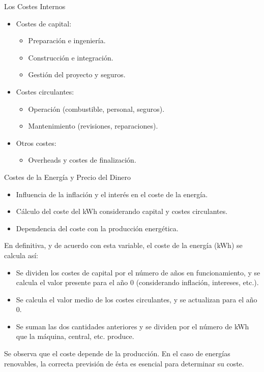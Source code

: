 \documentclass[main.tex]{subfiles}
\begin{document}
\begin{frame}{Los Costes Internos}
    \begin{itemize}
        \item Costes de capital:
        \begin{itemize}
            \item Preparación e ingeniería.
            \item Construcción e integración.
            \item Gestión del proyecto y seguros.
        \end{itemize}
        \item Costes circulantes:
        \begin{itemize}
            \item Operación (combustible, personal, seguros).
            \item Mantenimiento (revisiones, reparaciones).
        \end{itemize}
        \item Otros costes:
        \begin{itemize}
            \item Overheads y costes de finalización.
        \end{itemize}
    \end{itemize}
\end{frame}

\begin{frame}{Costes de la Energía y Precio del Dinero}
    \begin{itemize}
        \item Influencia de la inflación y el interés en el coste de la energía.
        \item Cálculo del coste del kWh considerando capital y costes circulantes.
        \item Dependencia del coste con la producción energética.
    \end{itemize}
    En definitiva, y de acuerdo con esta variable, el coste de la energía (kWh) se calcula así:
\begin{itemize}
    \item Se dividen los costes de capital por el número de años en funcionamiento, y se calcula el valor presente para el año 0 (considerando inflación, intereses, etc.).
    \item Se calcula el valor medio de los costes circulantes, y se actualizan para el año 0.
    \item Se suman las dos cantidades anteriores y se dividen por el número de kWh que la máquina, central, etc. produce.
\end{itemize}

Se observa que el coste depende de la producción. En el caso de energías renovables, la correcta previsión de ésta es esencial para determinar su coste.
\end{frame}
\end{document}
